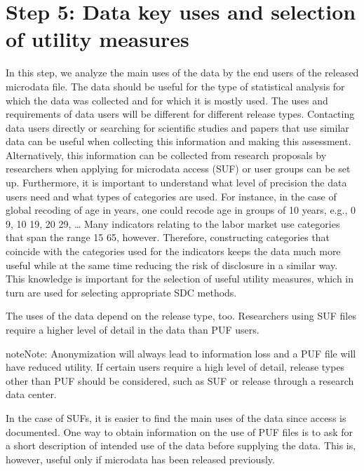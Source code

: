 \documentclass[letterpaper,10pt,english]{sphinxmanual}
\begin{document}
\section{Step 5: Data key uses and selection of utility measures}
\label{\detokenize{process:step-5-data-key-uses-and-selection-of-utility-measures}}
In this step, we analyze the main uses of the data by the end users of
the released microdata file. The data should be useful for the type of
statistical analysis for which the data was collected and for which it
is mostly used. The uses and requirements of data users will be
different for different release types. Contacting data users directly or
searching for scientific studies and papers that use similar data can be
useful when collecting this information and making this assessment.
Alternatively, this information can be collected from research proposals
by researchers when applying for microdata access (SUF) or user groups
can be set up. Furthermore, it is important to understand what level of
precision the data users need and what types of categories are used. For
instance, in the case of global recoding of age in years, one could
recode age in groups of 10 years, e.g., 0 \textendash{} 9, 10 \textendash{} 19, 20 \textendash{} 29, … Many
indicators relating to the labor market use categories that span the
range 15 \textendash{} 65, however. Therefore, constructing categories that coincide
with the categories used for the indicators keeps the data much more
useful while at the same time reducing the risk of disclosure in a
similar way. This knowledge is important for the selection of useful
utility measures, which in turn are used for selecting appropriate SDC
methods.

The uses of the data depend on the release type, too. Researchers using
SUF files require a higher level of detail in the data than PUF users.

\begin{sphinxadmonition}{note}{Note:}
Anonymization will always lead to information loss and a PUF
file will have reduced utility. If certain users require a high level of
detail, release types other than PUF should be considered, such as SUF
or release through a research data center.
\end{sphinxadmonition}

In the case of SUFs, it is
easier to find the main uses of the data since access is documented. One
way to obtain information on the use of PUF files is to ask for a short
description of intended use of the data before supplying the data. This
is, however, useful only if microdata has been released previously.
\end{document}
